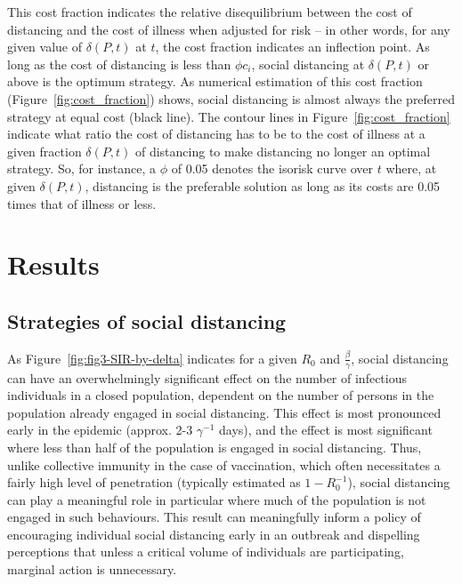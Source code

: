 \documentclass{article}
\begin{document}
This cost fraction indicates the relative disequilibrium between the cost of distancing and the cost of illness when adjusted for risk -- in other words, for any given value of $\delta(P, t)$ at $t$, the cost fraction indicates an inflection point. As long as the cost of distancing is less than $\phi c_i$, social distancing at $\delta(P, t)$ or above is the optimum strategy. As numerical estimation of this cost fraction (Figure~\ref{fig:cost_fraction}) shows, social distancing is almost always the preferred strategy at equal cost (black line). The contour lines in Figure~\ref{fig:cost_fraction} indicate what ratio the cost of distancing has to be to the cost of illness at a given fraction $\delta(P, t)$ of distancing to make distancing no longer an optimal strategy. So, for instance, a $\phi$ of 0.05 denotes the isorisk curve over $t$ where, at given $\delta(P, t)$, distancing is the preferable solution as long as its costs are 0.05 times that of illness or less. 



\section{Results} %
\label{sec:results}

\subsection{Strategies of social distancing} %
\label{sub:strategies_of_social_distancing}

As Figure~\ref{fig:fig3-SIR-by-delta} indicates for a given $R_0$ and $\frac{\beta}{\gamma}$, social distancing can have an overwhelmingly significant effect on the number of infectious individuals in a closed population, dependent on the number of persons in the population already engaged in social distancing. This effect is most pronounced early in the epidemic (approx. 2-3 $\gamma^{-1}$ days), and the effect is most significant where less than half of the population is engaged in social distancing. Thus, unlike collective immunity in the case of vaccination, which often necessitates a fairly high level of penetration (typically estimated as $1 - R_0^{-1}$), social distancing can play a meaningful role in particular where much of the population is not engaged in such behaviours. This result can meaningfully inform a policy of encouraging individual social distancing early in an outbreak and dispelling perceptions that unless a critical volume of individuals are participating, marginal action is unnecessary.
\end{document}
